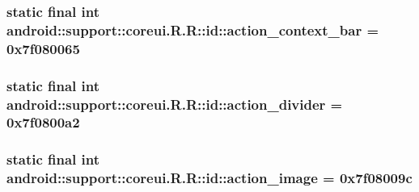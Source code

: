 \hypertarget{classandroid_1_1support_1_1coreui_1_1_r_1_1id_3ef576c72c32719a4d4346cb8b59f86b}{
\subsubsection[{action\_\-context\_\-bar}]{\setlength{\rightskip}{0pt plus 5cm}static final int android::support::coreui.R.R::id::action\_\-context\_\-bar = 0x7f080065}}
\label{classandroid_1_1support_1_1coreui_1_1_r_1_1id_3ef576c72c32719a4d4346cb8b59f86b}


\hypertarget{classandroid_1_1support_1_1coreui_1_1_r_1_1id_9667f1c9ddd9b1e5481cb0d5dffdc71c}{
\subsubsection[{action\_\-divider}]{\setlength{\rightskip}{0pt plus 5cm}static final int android::support::coreui.R.R::id::action\_\-divider = 0x7f0800a2}}
\label{classandroid_1_1support_1_1coreui_1_1_r_1_1id_9667f1c9ddd9b1e5481cb0d5dffdc71c}


\hypertarget{classandroid_1_1support_1_1coreui_1_1_r_1_1id_090841627e1fdb05dea60e6bfcdb9e07}{
\subsubsection[{action\_\-image}]{\setlength{\rightskip}{0pt plus 5cm}static final int android::support::coreui.R.R::id::action\_\-image = 0x7f08009c}}
\label{classandroid_1_1support_1_1coreui_1_1_r_1_1id_090841627e1fdb05dea60e6bfcdb9e07}


